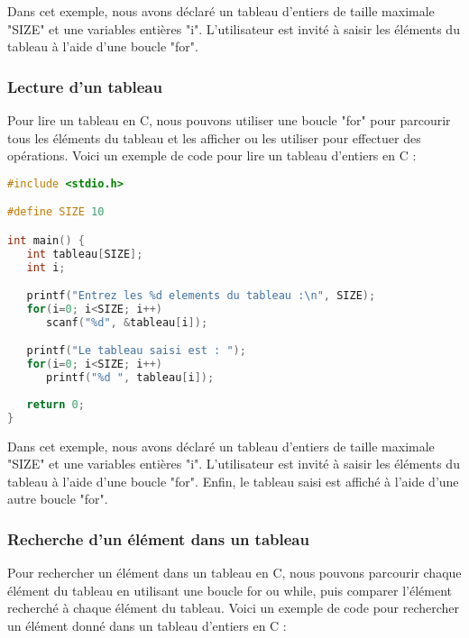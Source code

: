\documentclass{uofa-eng-assignment}
\begin{document}
\noindent \newline
Dans cet exemple, nous avons déclaré un tableau d'entiers de taille maximale "SIZE" et une variables entières "i". L'utilisateur est invité à saisir les éléments du tableau à l'aide d'une boucle "for". 

\subsubsection{Lecture d'un tableau}
Pour lire un tableau en C, nous pouvons utiliser une boucle "for" pour parcourir tous les éléments du tableau et les afficher ou les utiliser pour effectuer des opérations. Voici un exemple de code pour lire un tableau d'entiers en C :

\begin{lstlisting}[language=c]
#include <stdio.h>

#define SIZE 10

int main() {
   int tableau[SIZE];
   int i;

   printf("Entrez les %d elements du tableau :\n", SIZE);
   for(i=0; i<SIZE; i++)
      scanf("%d", &tableau[i]);

   printf("Le tableau saisi est : ");
   for(i=0; i<SIZE; i++)
      printf("%d ", tableau[i]);
   
   return 0;
}
\end{lstlisting}

\noindent \newline
Dans cet exemple, nous avons déclaré un tableau d'entiers de taille maximale "SIZE" et une variables entières "i". L'utilisateur est invité à saisir les éléments du tableau à l'aide d'une boucle "for". Enfin, le tableau saisi est affiché à l'aide d'une autre boucle "for".

\subsubsection{Recherche d'un élément dans un tableau}
Pour rechercher un élément dans un tableau en C, nous pouvons parcourir chaque élément du tableau en utilisant une boucle for ou while, puis comparer l'élément recherché à chaque élément du tableau. Voici un exemple de code pour rechercher un élément donné dans un tableau d'entiers en C :
\end{document}
